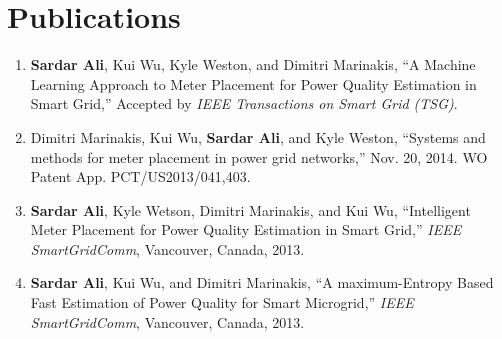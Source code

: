\chapter*{Publications}
\label{chap:publications}
\begin{enumerate}  
\item \textbf{Sardar Ali}, Kui Wu, Kyle Weston, and Dimitri Marinakis, ``A Machine Learning Approach to Meter Placement for Power Quality Estimation in Smart Grid,'' Accepted by \textit{IEEE Transactions on Smart Grid (TSG)}.

\item Dimitri Marinakis, Kui Wu, \textbf{Sardar Ali}, and Kyle Weston, ``Systems and methods for meter placement in power grid networks,'' Nov. 20, 2014. WO Patent App. PCT/US2013/041,403.

\item \textbf{Sardar Ali}, Kyle Wetson, Dimitri Marinakis, and Kui Wu, ``Intelligent Meter Placement for Power Quality Estimation in Smart Grid,'' \textit{IEEE SmartGridComm}, Vancouver, Canada, 2013.

\item \textbf{Sardar Ali}, Kui Wu, and Dimitri Marinakis, ``A maximum-Entropy Based Fast Estimation of Power Quality for Smart Microgrid,'' \textit{IEEE SmartGridComm}, Vancouver, Canada, 2013.
\end{enumerate}